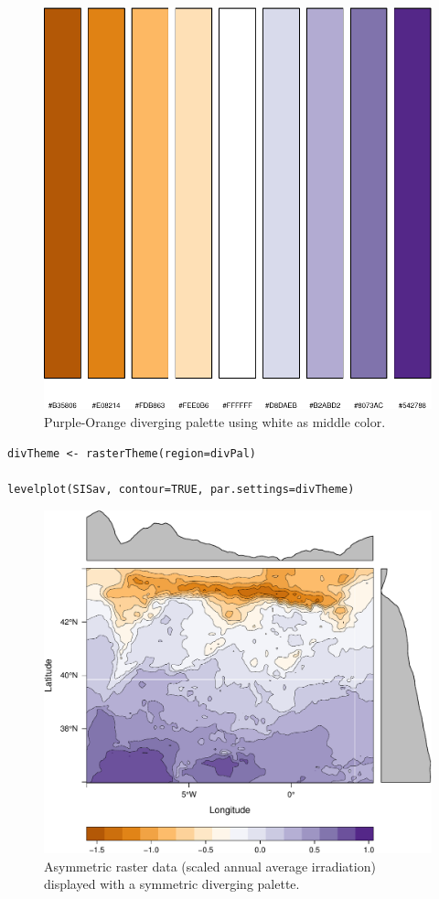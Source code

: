 \documentclass[smallroyalvopaper]{memoir}
\begin{document}
\begin{figure}[htb]
\centering
\includegraphics[height=0.3\textheight]{figs/showDivPal.pdf}
\caption{\label{fig:showDivPal}Purple-Orange diverging palette using white as middle color.}
\end{figure}


\lstset{language=R,numbers=none}
\begin{lstlisting}
divTheme <- rasterTheme(region=divPal)

levelplot(SISav, contour=TRUE, par.settings=divTheme)
\end{lstlisting}

\begin{figure}[htb]
\centering
\includegraphics[width=.9\linewidth]{figs/divPal_SISav_naive.pdf}
\caption{\label{fig:divPal_SISav_naive}Asymmetric raster data (scaled annual average irradiation) displayed with a symmetric diverging palette.}
\end{figure}
\end{document}

